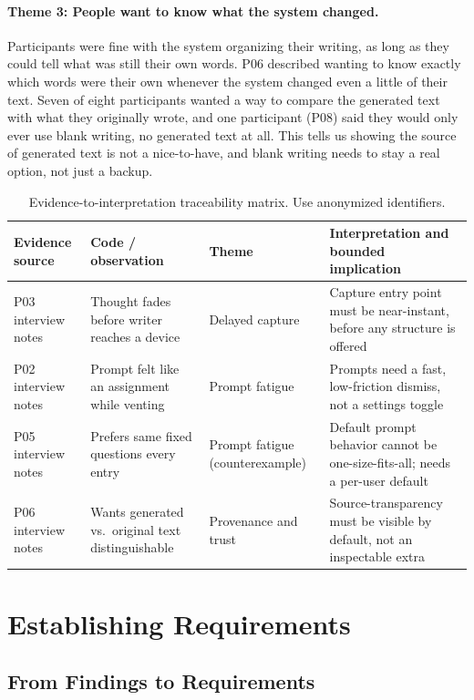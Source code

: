 \documentclass[sigconf,nonacm]{acmart}
\begin{document}
\paragraph{Theme 3: People want to know what the system changed.} Participants
were fine with the system organizing their writing, as long as they could
tell what was still their own words. P06 described wanting to know exactly
which words were their own whenever the system changed even a little of
their text. Seven of eight
participants wanted a way to compare the generated text with what they
originally wrote, and one participant (P08) said they would only ever use
blank writing, no generated text at all. This tells us showing the source of
generated text is not a nice-to-have, and blank writing needs to stay a real
option, not just a backup.

\begin{table}[tb]
  \centering
  \small
  \caption{Evidence-to-interpretation traceability matrix. Use anonymized identifiers.}
  \label{tab:evidence}
  \begin{tabularx}{\textwidth}{@{}X X X X@{}}
    \toprule
    Evidence source & Code / observation & Theme & Interpretation and bounded implication \\
    \midrule
    P03 interview notes & Thought fades before writer reaches a device & Delayed capture & Capture entry point must be near-instant, before any structure is offered \\
    P02 interview notes & Prompt felt like an assignment while venting & Prompt fatigue & Prompts need a fast, low-friction dismiss, not a settings toggle \\
    P05 interview notes & Prefers same fixed questions every entry & Prompt fatigue (counterexample) & Default prompt behavior cannot be one-size-fits-all; needs a per-user default \\
    P06 interview notes & Wants generated vs.\ original text distinguishable & Provenance and trust & Source-transparency must be visible by default, not an inspectable extra \\
    \bottomrule
  \end{tabularx}
\end{table}

\section{Establishing Requirements}
\label{sec:requirements}

\subsection{From Findings to Requirements}
\end{document}
